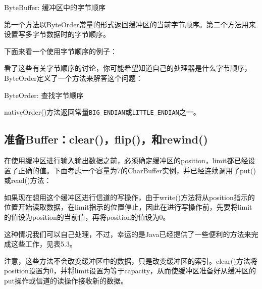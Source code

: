 		ByteBuffer: 缓冲区中的字节顺序 

		

		第一个方法以ByteOrder常量的形式返回缓冲区的当前字节顺序。第二个方法用来设置写多字节数据时的字节顺序。 

		下面来看一个使用字节顺序的例子： 

		

		看了这些有关字节顺序的讨论，你可能希望知道自己的处理器是什么字节顺序，ByteOrder定义了一个方法来解答这个问题： 

		ByteOrder: 查找字节顺序 

		

		nativeOrder()方法返回常量\verb|BIG_ENDIAN|或\verb|LITTLE_ENDIAN|之一。 
	
	\subsection{准备Buffer：clear()，flip()，和rewind()}

		在使用缓冲区进行输入输出数据之前，必须确定缓冲区的position，limit都已经设置了正确的值。下面考虑一个容量为7的CharBuffer实例，并已经连续调用了put()或read()方法： 

		

		如果现在想用这个缓冲区进行信道的写操作，由于write()方法将从position指示的位置开始读取数据，在limit指示的位置停止，因此在进行写操作前，先要将limit的值设为position的当前值，再将position的值设为0。 

		

		这种情况我们可以自己处理，不过，幸运的是Java已经提供了一些便利的方法来完成这些工作，见表5.3。 

		注意，这些方法不会改变缓冲区中的数据，只是改变缓冲区的索引。clear()方法将position设置为0，并将limit设置为等于capacity，从而使缓冲区准备好从缓冲区的put操作或信道的读操作接收新的数据。 

		

